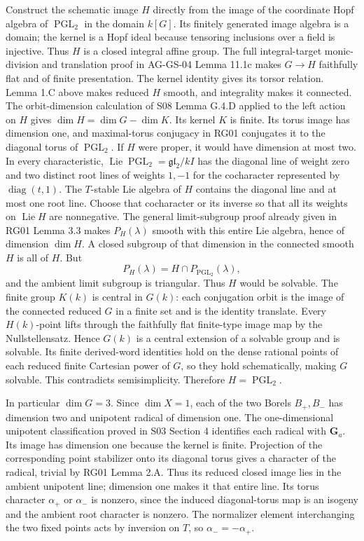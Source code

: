 \documentclass[11pt,a4paper,openany]{report}
\begin{document}
Construct the schematic image \(H\) directly from the image of the coordinate Hopf algebra of \(\operatorname{PGL}_2\) in the domain \(k[G]\). Its finitely generated image algebra is a domain; the kernel is a Hopf ideal because tensoring inclusions over a field is injective. Thus \(H\) is a closed integral affine group. The full integral-target monic-division and translation proof in AG-GS-04 Lemma 11.1c makes \(G\to H\) faithfully flat and of finite presentation. The kernel identity gives its torsor relation. Lemma 1.C above makes reduced \(H\) smooth, and integrality makes it connected. The orbit-dimension calculation of S08 Lemma G.4.D applied to the left action on \(H\) gives \(\dim H=\dim G-\dim K\). Its kernel \(K\) is finite. Its torus image has dimension one, and maximal-torus conjugacy in RG01 conjugates it to the diagonal torus of \(\operatorname{PGL}_2\). If \(H\) were proper, it would have dimension at most two. In every characteristic, \(\operatorname{Lie}\operatorname{PGL}_2=\mathfrak{gl}_2/kI\) has the diagonal line of weight zero and two distinct root lines of weights \(1,-1\) for the cocharacter represented by \(\operatorname{diag}(t,1)\). The \(T\)-stable Lie algebra of \(H\) contains the diagonal line and at most one root line. Choose that cocharacter or its inverse so that all its weights on \(\operatorname{Lie}H\) are nonnegative. The general limit-subgroup proof already given in RG01 Lemma 3.3 makes \(P_H(\lambda)\) smooth with this entire Lie algebra, hence of dimension \(\dim H\). A closed subgroup of that dimension in the connected smooth \(H\) is all of \(H\). But \[
 P_H(\lambda)=H\cap P_{\operatorname{PGL}_2}(\lambda),
\] and the ambient limit subgroup is triangular. Thus \(H\) would be solvable. The finite group \(K(k)\) is central in \(G(k)\): each conjugation orbit is the image of the connected reduced \(G\) in a finite set and is the identity translate. Every \(H(k)\)-point lifts through the faithfully flat finite-type image map by the Nullstellensatz. Hence \(G(k)\) is a central extension of a solvable group and is solvable. Its finite derived-word identities hold on the dense rational points of each reduced finite Cartesian power of \(G\), so they hold schematically, making \(G\) solvable. This contradicts semisimplicity. Therefore \(H=\operatorname{PGL}_2\).

In particular \(\dim G=3\). Since \(\dim X=1\), each of the two Borels \(B_+,B_-\) has dimension two and unipotent radical of dimension one. The one-dimensional unipotent classification proved in S03 Section 4 identifies each radical with \(\mathbf G_a\). Its image has dimension one because the kernel is finite. Projection of the corresponding point stabilizer onto its diagonal torus gives a character of the radical, trivial by RG01 Lemma 2.A. Thus its reduced closed image lies in the ambient unipotent line; dimension one makes it that entire line. Its torus character \(\alpha_+\) or \(\alpha_-\) is nonzero, since the induced diagonal-torus map is an isogeny and the ambient root character is nonzero. The normalizer element interchanging the two fixed points acts by inversion on \(T\), so \(\alpha_-=-\alpha_+\).
\end{document}
